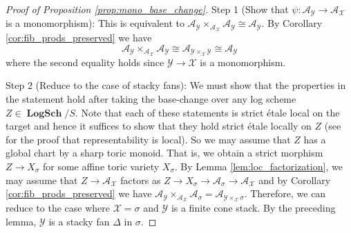 \documentclass[11pt]{amsart}
\theoremstyle{definition}
\theoremstyle{remark}
\DeclareMathOperator{\LogSch}{\mathbf{LogSch}}
\begin{document}
\begin{proof}[Proof of Proposition \ref{prop:mono_base_change}]
	Step 1 (Show that $\psi:\mathcal{A}_{\mathcal{Y}}\to \mathcal{A}_{\mathcal{X}}$ is a monomorphism): This
	is equivalent to $\mathcal{A}_{\mathcal{Y}}\times_{\mathcal{A}_{\mathcal{X}}}\mathcal{A}_{\mathcal{Y}}\cong \mathcal{A}_{\mathcal{Y}}$.
	By Corollary \ref{cor:fib_prods_preserved} we have
	$$\mathcal{A}_{\mathcal{Y}}\times_{\mathcal{A}_{\mathcal{X}}}\mathcal{A}_{\mathcal{Y}}\cong\mathcal{A}_{\mathcal{Y}\times_{\mathcal{X}}\mathcal{Y}}\cong \mathcal{A}_{\mathcal{Y}}$$
	where the second equality holds since $\mathcal{Y}\to \mathcal{X}$ is a monomorphism.

	Step 2 (Reduce to the case of stacky fans): We must show that the properties in the statement hold after taking the base-change over any log scheme $Z\in \LogSch/S$.
	Note that each of these statements is strict étale local on the target and hence it suffices to show that they hold
	strict étale locally on $Z$ (see \cite[Theorem 1.1 (3)]{fortman2025descentalgebraicstacks} for the proof that representability is local).
	So we may assume that $Z$ has a global chart by a sharp toric monoid.
	That is, we obtain a strict morphism $Z\to X_{\sigma}$ for some affine toric variety $X_{\sigma}$.
	By Lemma \ref{lem:loc_factorization}, we may assume that $Z\to \mathcal{A}_{\mathcal{X}}$ factors
	as $Z\to X_{\sigma}\to \mathcal{A}_{\sigma}\to \mathcal{A}_{\mathcal{X}}$ and by
	Corollary \ref{cor:fib_prods_preserved} we have $\mathcal{A}_{\mathcal{Y}}\times_{\mathcal{A}_{\mathcal{X}}}\mathcal{A}_{\sigma}=\mathcal{A}_{\mathcal{Y}\times_{\mathcal{X}}\sigma}$.
	Therefore, we can reduce to the case where $\mathcal{X}=\sigma$ and $\mathcal{Y}$ is a finite cone stack. By the preceding lemma,
	$\mathcal{Y}$ is a stacky fan $\Delta$ in $\sigma$.


\end{proof}
\end{document}
